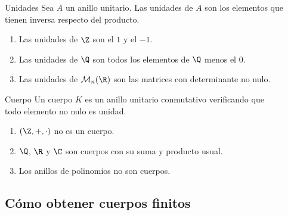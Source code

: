 \documentclass[10pt,t]{beamer}
\begin{document}
\begin{frame}%
\vspace{5em}
    \begin{block}{\centering \large Unidades}
        Sea $A$ un anillo unitario. Las \alert{unidades} de $A$ son los elementos que tienen inversa respecto del producto.
    \end{block}

    \begin{plainexample}
        \begin{enumerate}[label=--]
            \item Las unidades de $\Z$ son el $1$ y el $-1$.
            \item Las unidades de $\Q$ son todos los elementos de $\Q$ menos el $0$.
            \item Las unidades de $\mathcal{M}_n(\R)$ son las matrices con determinante no nulo.
        \end{enumerate}
    \end{plainexample}
\end{frame}

\begin{frame}%
    \begin{block}{\centering \large Cuerpo}
        \centering
        Un cuerpo $K$ es un anillo unitario conmutativo verificando que \\
        todo elemento no nulo es unidad.
    \end{block}

    \begin{plainexample}
        \begin{enumerate}[label=--]
            \item $(\Z,+, \cdot)$ no es un cuerpo.
            \item $\Q$, $\R$ y $\C$ son cuerpos con  su suma y producto usual.
            \item Los anillos de polinomios no son cuerpos.
        \end{enumerate}
    \end{plainexample}
\end{frame}

\subsection{Cómo obtener cuerpos finitos}
\end{document}
